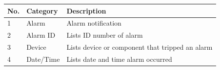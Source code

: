 \begin{longtable}[]{@{}|l|l|l|@{}}
\toprule
\rowcolor{brown}\begin{minipage}[b]{0.04\columnwidth}\raggedright
{\bf{No.}}\strut
\end{minipage} & \begin{minipage}[b]{0.23\columnwidth}\raggedright
{\bf{Category}}\strut
\end{minipage} & \begin{minipage}[b]{0.65\columnwidth}\raggedright
{\bf{Description}}\strut
\end{minipage}\tabularnewline
\midrule
\endhead
\begin{minipage}[t]{0.04\columnwidth}\raggedright
1\strut
\end{minipage} & \begin{minipage}[t]{0.23\columnwidth}\raggedright
Alarm\strut
\end{minipage} & \begin{minipage}[t]{0.65\columnwidth}\raggedright
Alarm notification\strut
\end{minipage}\tabularnewline
\begin{minipage}[t]{0.04\columnwidth}\raggedright
2\strut
\end{minipage} & \begin{minipage}[t]{0.23\columnwidth}\raggedright
Alarm ID\strut
\end{minipage} & \begin{minipage}[t]{0.65\columnwidth}\raggedright
Lists ID number of alarm\strut
\end{minipage}\tabularnewline
\begin{minipage}[t]{0.04\columnwidth}\raggedright
3\strut
\end{minipage} & \begin{minipage}[t]{0.23\columnwidth}\raggedright
Device\strut
\end{minipage} & \begin{minipage}[t]{0.65\columnwidth}\raggedright
Lists device or component that tripped an alarm\strut
\end{minipage}\tabularnewline
\begin{minipage}[t]{0.04\columnwidth}\raggedright
4\strut
\end{minipage} & \begin{minipage}[t]{0.23\columnwidth}\raggedright
Date/Time\strut
\end{minipage} & \begin{minipage}[t]{0.65\columnwidth}\raggedright
Lists date and time alarm occurred\strut

\end{minipage}
\end{longtable}
